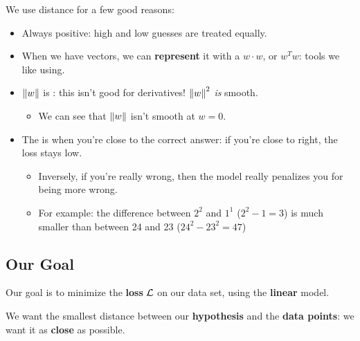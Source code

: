         \begin{concept}
             We use  distance for a few good reasons:
        
        \begin{itemize}
            \item Always positive: high and low guesses are treated equally.
            
            \item When we have vectors, we can \textbf{represent} it with a  $w \cdot w$, or  $w^T w$: tools we like using.
            
            \item $\left\lVert w\right\rVert$ is : this isn't good for derivatives! $\left\lVert w\right\rVert^2$ \textit{is} smooth.
                \begin{itemize}
                    \item We can see that $\left\lVert w\right\rVert$ isn't smooth at $w=0$.
                \end{itemize}

            \item The  is  when you're close to the correct answer: if you're close to right, the loss stays low.
                \begin{itemize}
                    \item Inversely, if you're really wrong, then the model really penalizes you for being more wrong.
                    \item For example: the difference between $2^2$ and $1^1$ ($2^2-1=3$) is much smaller than between 24 and 23 ($24^2-23^2=47$)
                \end{itemize}
        \end{itemize}
        \end{concept}
        
       
        
    \subsection{Our Goal}
        
        Our goal is to minimize the \textbf{loss} $\mathcal{L}$ on our data set, using the \textbf{linear} model.
        
        We want the smallest distance between our \textbf{hypothesis} and the \textbf{data points}: we want it as \textbf{close} as possible.
        

